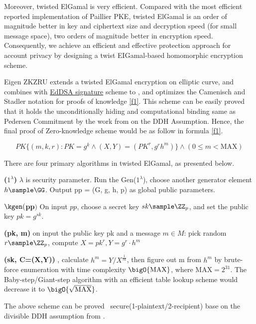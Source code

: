 \documentclass{article}
\begin{document}
Moreover, twisted ElGamal is very efficient. Compared with the most efficient reported implementation of Paillier PKE, twisted ElGamal is an order of magnitude better in key and ciphertext size and decryption speed (for small message space), two orders of magnitude better in encryption speed. Consequently, we achieve an efficient and effective protection approach for account privacy by designing a twist EIGamal-based homomorphic encryption scheme.

Eigen ZKZRU extends a twisted ElGamal encryption on elliptic curve, and combines with \href{https://datatracker.ietf.org/doc/html/rfc8032}{EdDSA signature} scheme to , and optimizes the Camenisch and Stadler \cite{camenisch1997efficient} notation for proofs of knowledge \ref{f1}. This scheme can be easily proved that it holds the unconditionally hiding and computational binding same as Pedersen Commitment by the work from \cite{bunz2020zether,chen2020pgc} on the DDH Assumption. Hence, the final proof of Zero-knowledge scheme would be as follow in formula \ref{f1}.

\begin{equation}
 PK\{(m, k, r): PK = g^k \land (X, Y) = (PK^{r}, g^r h^m)\} \land (0 \leq m < \mbox{MAX}) \label{f1}  
\end{equation}

There are four primary algorithms in twisted ElGamal, as presented below.

\textbf{\pgen($1^\lambda$)} $\lambda$ is security parameter.  Run the Gen($1^\lambda$), choose another generator element $h \sample \GG$. Output pp = (G, g, h, p) as global public parameters.

\textbf{$\kgen($pp$)$} On input $pp$, choose a secret key $sk \sample \ZZ_p$, and set the public key $pk = g^{sk}$.

\textbf{\enc(pk, m)} on input the public key pk and a message $m \in  M$: pick random $r \sample \ZZ_p$, compute $X=pk^r, Y = g^r \cdot h^m$

\textbf{\dec(sk, C=(X,Y))} , calculate $h^m = {Y}/{X^{\frac{1}{sk}}}$,  then figure out m from $h^m$ by brute-force enumeration with time complexity $\bigO{\mbox{MAX}}$, where $\mbox{MAX}=2^{31}$. The Baby-step/Giant-step algorithm \cite{Shanks1971ClassNA} with an efficient table lookup scheme would decrease it to $\bigO{\sqrt{\mbox{MAX}}}$.

The above scheme can be proved \indcpa\ secure(1-plaintext/2-recipient) base on the divisible DDH assumption from \cite{chen2020pgc}.
\end{document}
